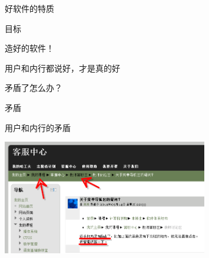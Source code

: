 \begin{frame}{好软件的特质}
  \begin{block}{目标}
    \begin{center}
      \Huge 造好的软件！
    \end{center}
  \end{block}
  \pause
  \begin{block}{}
    \begin{center}
      \LARGE 用户和内行都说好，才是真的好
    \end{center}
  \end{block}
  \pause
  \begin{block}{}
    \begin{center}
      \LARGE \alert{矛盾}了怎么办？
    \end{center}
  \end{block}
\end{frame}

\begin{frame}{矛盾}
  \begin{block}{用户和内行的矛盾}
    \begin{center}
      \includegraphics[height=5cm]{cms_navbar.png}
    \end{center}
  \end{block}
\end{frame}

